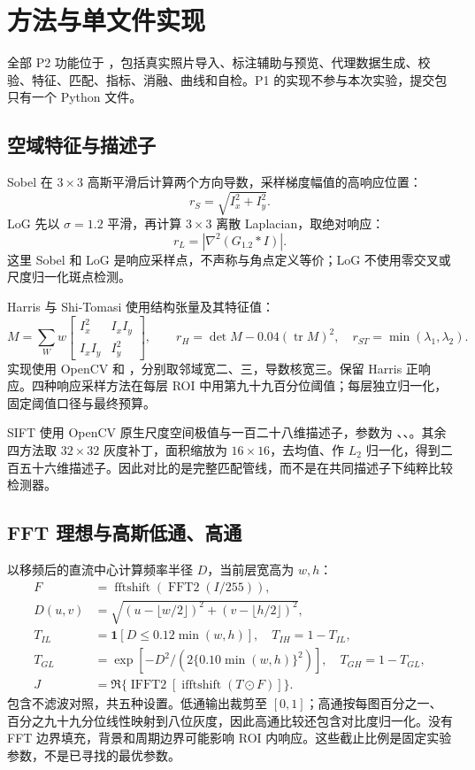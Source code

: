 \section{方法与单文件实现}
全部 P2 功能位于 ，包括真实照片导入、标注辅助与预览、代理数据生成、校验、特征、匹配、指标、消融、曲线和自检。P1 的实现不参与本次实验，提交包只有一个 Python 文件。

\subsection{空域特征与描述子}
Sobel 在 $3\times3$ 高斯平滑后计算两个方向导数，采样梯度幅值的高响应位置：
\begin{equation}
r_S=\sqrt{I_x^2+I_y^2}.
\end{equation}
LoG 先以 $\sigma=1.2$ 平滑，再计算 $3\times3$ 离散 Laplacian，取绝对响应：
\begin{equation}
r_L=|\nabla^2(G_{1.2}*I)|.
\end{equation}
这里 Sobel 和 LoG 是响应采样点，不声称与角点定义等价；LoG 不使用零交叉或尺度归一化斑点检测。

Harris 与 Shi-Tomasi 使用结构张量及其特征值：
\begin{equation}
M=\sum_W w\begin{bmatrix}I_x^2&I_xI_y\\I_xI_y&I_y^2\end{bmatrix},\qquad
r_H=\det M-0.04(\operatorname{tr}M)^2,\quad r_{ST}=\min(\lambda_1,\lambda_2).
\end{equation}
实现使用 OpenCV  和 ，分别取邻域宽二、三，导数核宽三。保留 Harris 正响应。四种响应采样方法在每层 ROI 中用第九十九百分位阈值；每层独立归一化，固定阈值口径与最终预算。

SIFT 使用 OpenCV 原生尺度空间极值与一百二十八维描述子，参数为 、、。其余四方法取 $32\times32$ 灰度补丁，面积缩放为 $16\times16$，去均值、作 $L_2$ 归一化，得到二百五十六维描述子。因此对比的是完整匹配管线，而不是在共同描述子下纯粹比较检测器。

\subsection{FFT 理想与高斯低通、高通}
以移频后的直流中心计算频率半径 $D$，当前层宽高为 $w,h$：
\begin{align}
F&=\operatorname{fftshift}(\operatorname{FFT2}(I/255)),\\
D(u,v)&=\sqrt{(u-\lfloor w/2\rfloor)^2+(v-\lfloor h/2\rfloor)^2},\\
T_{IL}&=\mathbf 1[D\leq0.12\min(w,h)],\quad T_{IH}=1-T_{IL},\\
T_{GL}&=\exp[-D^2/(2\{0.10\min(w,h)\}^2)],\quad T_{GH}=1-T_{GL},\\
J&=\Re\{\operatorname{IFFT2}[\operatorname{ifftshift}(T\odot F)]\}.
\end{align}
包含不滤波对照，共五种设置。低通输出裁剪至 $[0,1]$；高通按每图百分之一、百分之九十九分位线性映射到八位灰度，因此高通比较还包含对比度归一化。没有 FFT 边界填充，背景和周期边界可能影响 ROI 内响应。这些截止比例是固定实验参数，不是已寻找的最优参数。

